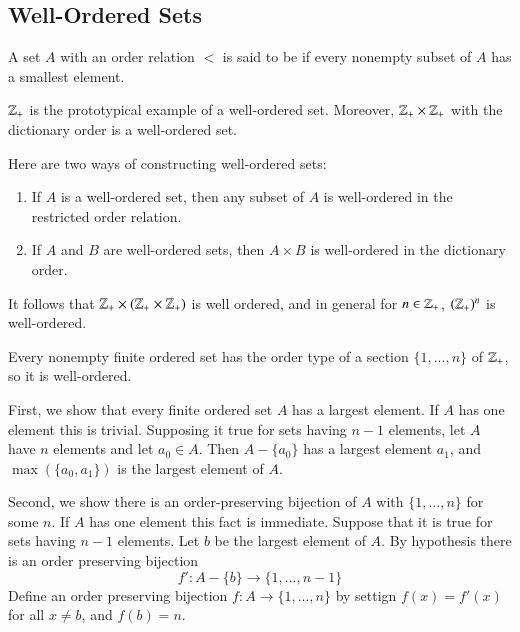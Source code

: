 \documentclass[12pt, a4paper, twoside, openright, titlepage]{book}
\begin{document}
\begin{appendices}
    \section{Well-Ordered Sets}

    
    \begin{defn}{}{}
        A set $A$ with an order relation $<$ is said to be  if every nonempty subset of $A$ has a smallest element.
    \end{defn}

    \begin{eg}{}{}
        $\mathbb Z_+$ is the prototypical example of a well-ordered set. Moreover, $\mathbb Z_+\times \mathbb Z_+$ with the dictionary order is a well-ordered set.
    \end{eg}

    \begin{rmk}{}{}
        Here are two ways of constructing well-ordered sets:\begin{enumerate}
            \item If $A$ is a well-ordered set, then any subset of $A$ is well-ordered in the restricted order relation.
            \item If $A$ and $B$ are well-ordered sets, then $A\times B$ is well-ordered in the dictionary order.
        \end{enumerate}
        It follows that $\mathbb Z_+\times(\mathbb Z_+\times \mathbb Z_+)$ is well ordered, and in general for $n \in \mathbb Z_+$, $(\mathbb Z_+)^n$ is well-ordered.
    \end{rmk}

    \begin{thm}{}{}
        Every nonempty finite ordered set has the order type of a section $\{1,...,n\}$ of $\mathbb Z_+$, so it is well-ordered.
    \end{thm}
    \begin{proof*}{}{}
        First, we show that every finite ordered set $A$ has a largest element. If $A$ has one element this is trivial. Supposing it true for sets having $n-1$ elements, let $A$ have $n$ elements and let $a_0 \in A$. Then $A-\{a_0\}$ has a largest element $a_1$, and $\max(\{a_0,a_1\})$ is the largest element of $A$.


        Second, we show there is an order-preserving bijection of $A$ with $\{1,...,n\}$ for some $n$. If $A$ has one element this fact is immediate. Suppose that it is true for sets having $n-1$ elements. Let $b$ be the largest element of $A$. By hypothesis there is an order preserving bijection \begin{equation*}
            f':A-\{b\}\rightarrow \{1,...,n-1\}
        \end{equation*}
        Define an order preserving bijection $f:A\rightarrow \{1,...,n\}$ by settign $f(x) = f'(x)$ for all $x \neq b$, and $f(b) = n$.
    \end{proof*}


\end{appendices}
\end{document}
